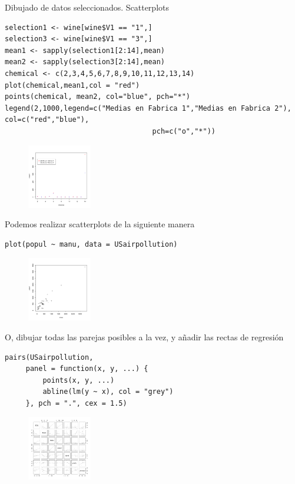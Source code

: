 \documentclass[xcolor=table]{beamer}
\begin{document}
\begin{frame}{Dibujado de datos seleccionados. Scatterplots}
\begin{lstlisting}
selection1 <- wine[wine$V1 == "1",]
selection3 <- wine[wine$V1 == "3",]
mean1 <- sapply(selection1[2:14],mean)
mean2 <- sapply(selection3[2:14],mean)
chemical <- c(2,3,4,5,6,7,8,9,10,11,12,13,14)
plot(chemical,mean1,col = "red")
points(chemical, mean2, col="blue", pch="*")
legend(2,1000,legend=c("Medias en Fabrica 1","Medias en Fabrica 2"), col=c("red","blue"),
                                   pch=c("o","*"))
\end{lstlisting}
\begin{figure}
\centering
\includegraphics[width=0.25\textwidth]{means.png}
\end{figure}
Podemos realizar scatterplots de la siguiente manera
\begin{lstlisting}
plot(popul ~ manu, data = USairpollution)
\end{lstlisting}
\begin{figure}
\centering
\includegraphics[width=0.25\textwidth]{scatter.png}
\end{figure}
O, dibujar todas las parejas posibles a la vez, y añadir las rectas de regresión
\begin{lstlisting}
pairs(USairpollution,
     panel = function(x, y, ...) {
         points(x, y, ...)
         abline(lm(y ~ x), col = "grey")
     }, pch = ".", cex = 1.5)
\end{lstlisting}
\begin{figure}
\centering
\includegraphics[width=0.25\textwidth]{reg.png}
\end{figure}
\end{frame}
\end{document}
